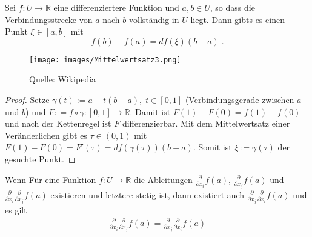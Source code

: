 \begin{Satz}[Mittelwertsatz]
Sei $f :U \to \mathbb{R}$ eine differenziertere Funktion und $a, b \in U$, so dass die Verbindungsstrecke von $a$ nach $b$ vollständig in $U$ liegt. 
Dann gibts es einen Punkt $\xi \in [a,b]$ mit
$$f(b) - f(a) = df(\xi) (b-a) \; .$$ 
\end{Satz}
\begin{figure}[H]
      \centering
    \texttt{[image: images/Mittelwertsatz3.png]}
      \caption{Quelle: Wikipedia}
\end{figure}
\begin{proof}
Setze $\gamma(t) := a + t(b-a), \; t \in [0,1]$ (Verbindungsgerade zwischen $a$ und $b$) und $F : = f  \circ \gamma : [0,1] \to \mathbb{R}$.
Damit ist $F(1)- F(0) = f(1) - f(0)$ und nach der Kettenregel ist $F$ differenzierbar.  Mit dem Mittelwertsatz einer Veränderlichen gibt es $\tau \in (0,1)$ mit 
$F(1) - F(0) = F'(\tau) = df(\gamma (\tau)) (b-a)$. Somit ist $\xi := \gamma(\tau)$ der gesuchte Punkt.
\end{proof}


\begin{Satz}
Wenn Für eine Funktion $f: U \to \mathbb{R}$ die Ableitungen $\frac{\partial}{\partial x_i} f(a)$, $\frac{\partial}{\partial x_j}f(a)$ und $ \frac{\partial}{\partial x_i}\frac{\partial }{\partial x_j} f(a)$ existieren und letztere stetig ist, dann existiert auch $ \frac{\partial}{\partial x_j}\frac{\partial }{\partial x_i} f(a)$ und es gilt
\begin{align*}
\frac{\partial}{\partial x_i}\frac{\partial }{\partial x_j} f(a) = \frac{\partial}{\partial x_j}\frac{\partial }{\partial x_i} f(a)
\end{align*}
\end{Satz}



